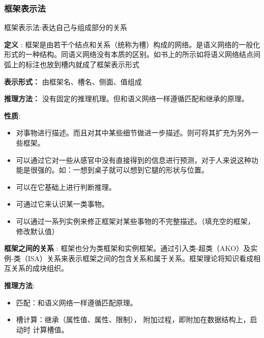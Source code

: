 \documentclass[UTF8,a4paper]{ctexart}
\begin{document}
\subsubsection{框架表示法}
框架表示法:表达自己与组成部分的关系

\textbf{定义} : 框架是由若干个结点和关系（统称为槽）构成的网络。是语义网络的一般化形式的一种结构。同语义网络没有本质的区别。如书上的所示如将语义网络结点间弧上的标注也放到槽内就成了框架表示形式

\textbf{表示形式：}
由框架名、槽名、侧面、值组成

\textbf{推理方法：}
没有固定的推理机理。但和语义网络一样遵循匹配和继承的原理。

\textbf{性质}:
\begin{itemize}
	\item 对事物进行描述。而且对其中某些细节做进一步描述。则可将其扩充为另外一些框架。
	\item 可以通过它对一些从感官中没有直接得到的信息进行预测，对于人来说这种功能是很强的。如：一想到桌子就可以想到它腿的形状与位置。
	\item 可以在它基础上进行判断推理。
	\item 可通过它来认识某一类事物。
	\item 可以通过一系列实例来修正框架对某些事物的不完整描述。（填充空的框架，修改默认值）
\end{itemize}

\textbf{框架之间的关系} : 框架也分为类框架和实例框架。通过引入类-超类（AKO）及实例-类（ISA）关系来表示框架之间的包含关系和属于关系。框架理论将知识看成相互关系的成块组织。

\textbf{推理方法}:
\begin{itemize}
	\item 匹配：和语义网络一样遵循匹配原理。
	\item 槽计算：继承（属性值、属性、限制），
	      附加过程，即附加在数据结构上，启动时
	      计算槽值。
\end{itemize}
\end{document}
